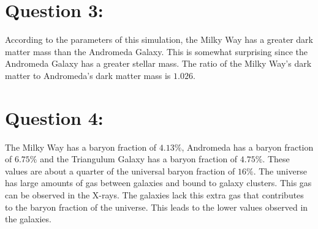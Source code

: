 \documentclass[
  journal=Notes,
  manuscript=Homework,
  year=2022,
  volume=1,
]{dgl-journal}
\begin{document}
\section{Question 3:}
According to the parameters of this simulation, the Milky Way has a greater dark matter mass than the Andromeda Galaxy. This is somewhat surprising since the Andromeda Galaxy has a greater stellar mass. The ratio of the Milky Way's dark matter to Andromeda's dark matter mass is $1.026$.

\section{Question 4:}
The Milky Way has a baryon fraction of $4.13\%$, Andromeda has a baryon fraction of $6.75\%$ and the Triangulum Galaxy has a baryon fraction of $4.75\%$. These values are about a quarter of the universal baryon fraction of $16\%$. The universe has large amounts of gas between galaxies and bound to galaxy clusters. This gas can be observed in the X-rays. The galaxies lack this extra gas that contributes to the baryon fraction of the universe. This leads to the lower values observed in the galaxies.
\end{document}
